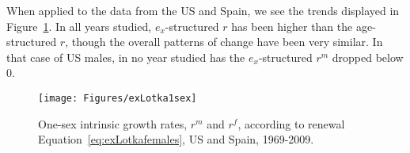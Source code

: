   \FloatBarrier
 When applied to the data from the US and Spain, we see the trends
displayed in Figure~\ref{fig:rex1sex}. In all years studied, $e_x$-structured
$r$ has been higher than the age-structured $r$, though the overall patterns of
change have been very similar. In that case of US males, in no year studied
has the $e_x$-structured $r^m$ dropped below 0.

\begin{figure}[!ht]
  \centering
    \caption{One-sex intrinsic growth rates, $r^m$ and $r^f$, according to
    renewal Equation~\eqref{eq:exLotkafemales}, US and Spain, 1969-2009.}
     \texttt{[image: Figures/exLotka1sex]}
     \label{fig:rex1sex}
\end{figure}